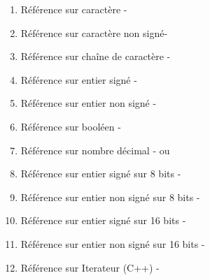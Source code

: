 \begin{enumerate}
    \item Référence sur caractère - 
    \item Référence sur caractère non signé- 
    \item Référence sur chaîne de caractère - 
    \item Référence sur entier signé - 
    \item Référence sur entier non signé - 
    \item Référence sur booléen - 
    \item Référence sur nombre décimal -  ou 
    \item Référence sur entier signé sur 8 bits - 
    \item Référence sur entier non signé sur 8 bits - 
    \item Référence sur entier signé sur 16 bits - 
    \item Référence sur entier non signé sur 16 bits -     
    \item Référence sur Iterateur (C++) -   
    
\end{enumerate}
